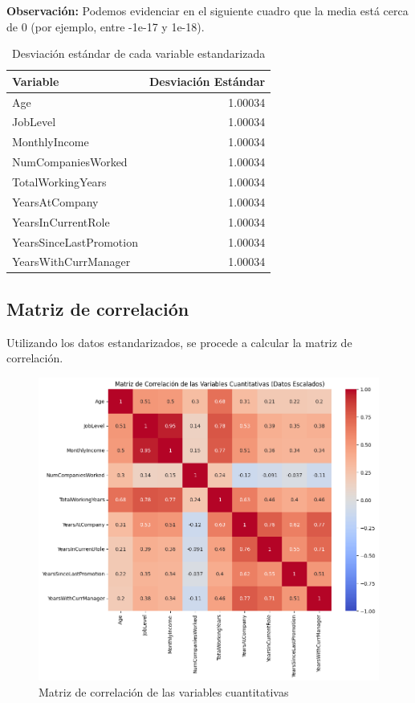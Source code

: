 \textbf{Observación:}
Podemos evidenciar en el siguiente cuadro que la media está 
cerca de 0 (por ejemplo, entre -1e-17 y 1e-18).

\begin{table}[H]
\centering
\begin{tabular}{|l|r|}
\hline
\textbf{Variable} & \textbf{Desviación Estándar} \\ \hline
Age                        & 1.00034 \\ \hline
JobLevel                   & 1.00034 \\ \hline
MonthlyIncome              & 1.00034 \\ \hline
NumCompaniesWorked         & 1.00034 \\ \hline
TotalWorkingYears          & 1.00034 \\ \hline
YearsAtCompany             & 1.00034 \\ \hline
YearsInCurrentRole         & 1.00034 \\ \hline
YearsSinceLastPromotion    & 1.00034 \\ \hline
YearsWithCurrManager       & 1.00034 \\ \hline
\end{tabular}
\caption{Desviación estándar de cada variable estandarizada}
\end{table}

\subsection{Matriz de correlación}
Utilizando los datos estandarizados, se procede a calcular la matriz de correlación.

\begin{figure}[h!]
    \centering
    \includegraphics[width=1\textwidth]{images/matriz-de-correlacion.png}
    \caption{Matriz de correlación de las variables cuantitativas}
    \label{fig:matriz_correlacion}
\end{figure}

